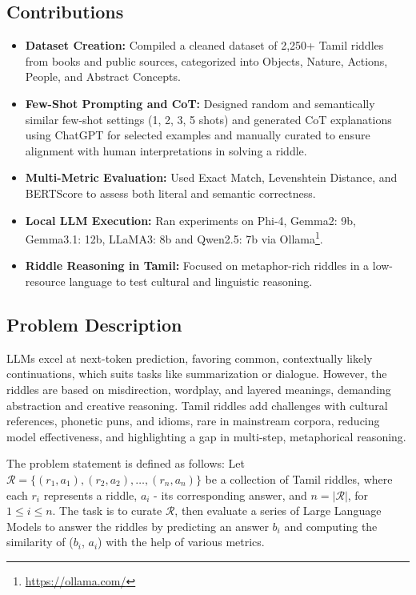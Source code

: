 \documentclass[11pt]{article}
\begin{document}
\subsection{Contributions}
\begin{itemize}
    \item \textbf{Dataset Creation:} Compiled a cleaned dataset of 2,250+ Tamil riddles from books and public sources, categorized into Objects, Nature, Actions, People, and Abstract Concepts.
    \item \textbf{Few-Shot Prompting and CoT:} Designed random and semantically similar few-shot settings (1, 2, 3, 5 shots) and generated CoT explanations using ChatGPT for selected examples and manually curated to ensure alignment with human interpretations in solving a riddle.
    \item \textbf{Multi-Metric Evaluation:} Used Exact Match, Levenshtein Distance, and BERTScore to assess both literal and semantic correctness.  
    \item \textbf{Local LLM Execution:} Ran experiments on Phi-4, Gemma2: 9b, Gemma3.1: 12b, LLaMA3: 8b and Qwen2.5: 7b via Ollama\footnote{\url{https://ollama.com/}}.  
    \item \textbf{Riddle Reasoning in Tamil:} Focused on metaphor-rich riddles in a low-resource language to test cultural and linguistic reasoning.  
\end{itemize}

\subsection{Problem Description}
LLMs excel at next-token prediction, favoring common, contextually likely continuations, which suits tasks like summarization or dialogue. However, the riddles are based on misdirection, wordplay, and layered meanings, demanding abstraction and creative reasoning. Tamil riddles add challenges with cultural references, phonetic puns, and idioms, rare in mainstream corpora, reducing model effectiveness, and highlighting a gap in multi-step, metaphorical reasoning.

The problem statement is defined as follows: Let \(\mathcal{R} = \{(r_1, a_1), (r_2, a_2), \dots, (r_n, a_n)\}\) be a collection of Tamil riddles, where each \(r_i\) represents a riddle, \(a_i\) - its corresponding answer, and \(n = |\mathcal{R}|\), for \(1 \leq i \leq n\). The task is to curate \(\mathcal{R}\), then evaluate a series of Large Language Models to answer the riddles by predicting an answer \(b_i\) and computing the similarity of (\(b_i\), \(a_i\)) with the help of various metrics.
\end{document}
